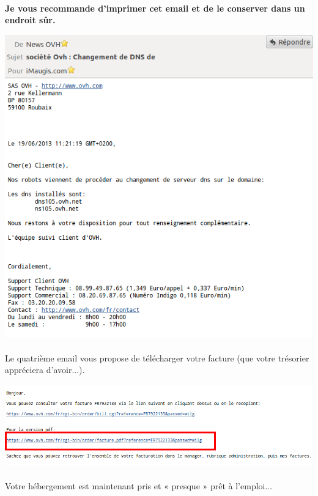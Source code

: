\documentclass[10pt,a4paper]{article}
\begin{document}
\paragraph{}\begin{center}\textbf{Je vous recommande d'imprimer cet email et de le conserver dans un endroit sûr.}\end{center}
\begin{center}
\includegraphics[scale=0.4]{img/0291.png}
\end{center}
\paragraph{}Le quatrième email vous propose de télécharger votre facture (que votre trésorier appréciera d'avoir...).
\begin{center}
\includegraphics[scale=0.3]{img/0292.png}
\end{center}
\paragraph{}Votre hébergement est maintenant pris et « presque » prêt à l'emploi...
\newpage
\end{document}
